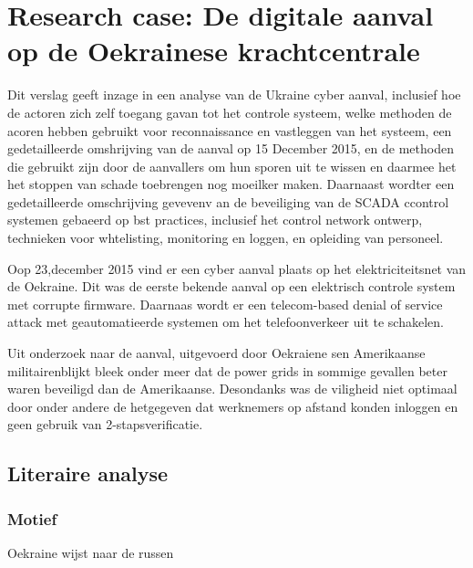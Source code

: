 	\section{Research case: De digitale aanval op de Oekrainese krachtcentrale}
Dit verslag geeft inzage in een analyse van de Ukraine cyber aanval,
inclusief hoe de actoren zich zelf toegang gavan tot het controle systeem, welke methoden de acoren hebben gebruikt voor reconnaissance en vastleggen van het systeem, een gedetailleerde omshrijving van de aanval op 15 December 2015, en de methoden die gebruikt zijn door de aanvallers om hun sporen uit te wissen en daarmee het het stoppen van schade toebrengen  nog moeilker maken. Daarnaast wordter  een gedetailleerde omschrijving gevevenv an de beveiliging van de SCADA ccontrol systemen gebaeerd op bst practices, inclusief het control network ontwerp, technieken voor whtelisting, monitoring en loggen, en  opleiding van personeel.


\cite{Whitehead2017ukrainepoweroutage}
\cite{zetter2016GridHack}
\cite{boozallen2016lightwentout}
\cite{finklejan2016UsBlamesRussianSandworm}
\cite{desarnaud2017cyberattacks}
\cite{caseli04112016intrusiondetectioncontrolsystem}
\cite{rochascadatesting}
\cite{hidajat2016ScadaSimulator}
\cite{zetter2017moreDangerousMalware}


Oop 23,december 2015  vind er een cyber aanval plaats op het elektriciteitsnet van de Oekraine. Dit was de eerste bekende aanval op een elektrisch controle  system met corrupte firmware. Daarnaas wordt er een telecom-based denial of service attack met  geautomatieerde systemen om het telefoonverkeer uit te schakelen.
\cite{Whitehead2017ukrainepoweroutage}

Uit onderzoek\cite{zetter2016GridHack} naar de aanval,  uitgevoerd door Oekraiene sen Amerikaanse militairenblijkt  bleek onder meer dat de power grids in sommige gevallen beter waren beveiligd dan de Amerikaanse. Desondanks was de viligheid niet optimaal door onder andere de  hetgegeven dat werknemers op afstand konden inloggen en geen gebruik van 2-stapsverificatie.


\subsection{Literaire analyse}

\subsubsection{Motief}
Oekraine wijst naar de russen \cite{zetter2016GridHack}


